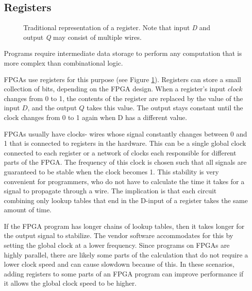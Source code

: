 \subsection{Registers}
\begin{figure}
\centering
{}
\caption{Traditional representation of a register. Note that input \textit{D} and output \textit{Q} may consist of multiple wires.}
\label{fig:register}
\end{figure}

Programs require intermediate data storage to perform any computation that is more complex than combinational logic.

FPGAs use registers for this purpose (see Figure \ref{fig:register}). Registers can store a small collection of bits, depending on the FPGA design. When a register's input $clock$ changes from 0 to 1, the contents of the register are replaced by the value of the input $D$, and the output $Q$ takes this value. The output stays constant until the clock changes from 0 to 1 again when D has a different value.

FPGAs usually have clocks- wires whose signal constantly changes between 0 and 1 that is connected to registers in the hardware. This can be a single global clock connected to each register or a network of clocks each responsible for different parts of the FPGA. The frequency of this clock is chosen such that all signals are guaranteed to be stable when the clock becomes 1. This stability is very convenient for programmers, who do not have to calculate the time it takes for a signal to propagate through a wire. The implication is that each circuit combining only lookup tables that end in the D-input of a register takes the same amount of time.

If the FPGA program has longer chains of lookup tables, then it takes longer for the output signal to stabilize. The vendor software accommodates for this by setting the global clock at a lower frequency. Since programs on FPGAs are highly parallel, there are likely some parts of the calculation that do not require a lower clock speed and can cause slowdown because of this. In these scenarios, adding registers to some parts of an FPGA program can improve performance if it allows the global clock speed to be higher.


